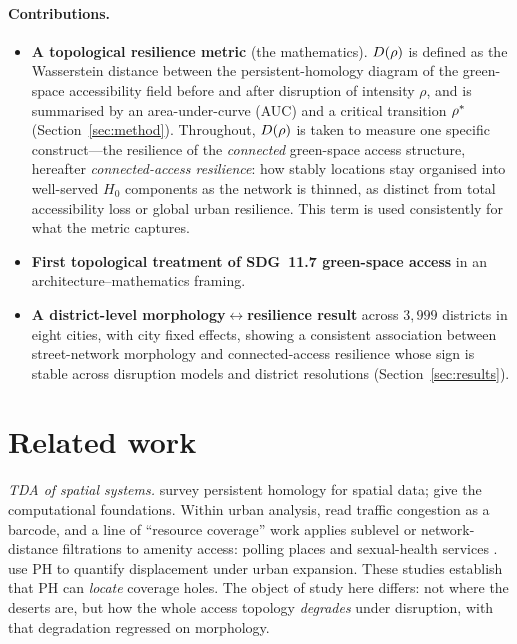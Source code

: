 \paragraph{Contributions.}
\begin{itemize}
  \item \textbf{A topological resilience metric} (the mathematics). $D(\rho)$ is
    defined as the Wasserstein distance between the persistent-homology diagram of
    the green-space accessibility field before and after disruption of intensity
    $\rho$, and is summarised by an area-under-curve (AUC) and a critical
    transition $\rho^{*}$ (Section~\ref{sec:method}). Throughout, $D(\rho)$ is taken to
    measure one specific construct---the resilience of the \emph{connected} green-space
    access structure, hereafter \emph{connected-access resilience}: how stably locations
    stay organised into well-served $H_0$ components as the network is thinned, as
    distinct from total accessibility loss or global urban resilience. This term is used
    consistently for what the metric captures.
  \item \textbf{First topological treatment of SDG~11.7 green-space access} in an
    architecture--mathematics framing.
  \item \textbf{A district-level morphology$\leftrightarrow$resilience result}
    across $3{,}999$ districts in eight cities, with city fixed effects, showing a
    consistent association between street-network morphology and connected-access
    resilience whose sign is stable across disruption models and district resolutions
    (Section~\ref{sec:results}).
\end{itemize}

\section{Related work}
\emph{TDA of spatial systems.} \citet{feng2021tda} survey persistent homology for
spatial data; \citet{otter2017roadmap} give the computational foundations. Within
urban analysis, \citet{wu2017congestion} read traffic congestion as a barcode,
and a line of ``resource coverage'' work applies sublevel or network-distance
filtrations to amenity access: polling places \citep{hickok2022polling} and
sexual-health services \citep{gonzalez2025healthcare}. \citet{rodriguez2025displacement}
use PH to quantify displacement under urban expansion. These studies establish
that PH can \emph{locate} coverage holes. The object of study here differs: not
where the deserts are, but how the whole access topology \emph{degrades} under
disruption, with that degradation regressed on morphology.


